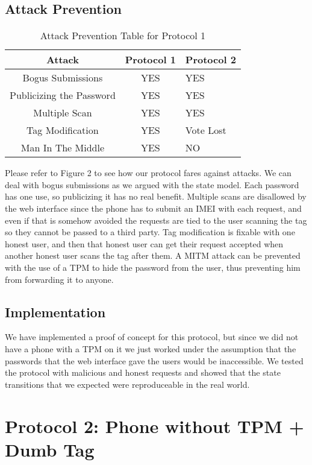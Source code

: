 \documentclass{sig-alternate}
\begin{document}
\subsection{Attack Prevention}
\begin{table}
\centering
\caption{Attack Prevention Table for Protocol 1}
\begin{tabular}{|c|c|l|} \hline
Attack&Protocol 1&Protocol 2\\ \hline
Bogus Submissions & YES & YES\\ \hline
Publicizing the Password& YES & YES\\ \hline
Multiple Scan& YES & YES\\ \hline
Tag Modification& YES & Vote Lost\\ \hline
Man In The Middle& YES & NO\\
\hline\end{tabular}
\end{table}


Please refer to Figure 2 to see how our protocol fares against
attacks. We can deal with bogus submissions as we argued with the
state model. Each password has one use, so publicizing it has no real
benefit. Multiple scans are disallowed by the web interface since the
phone has to submit an IMEI with each request, and even if that is
somehow avoided the requests are tied to the user scanning the tag so
they cannot be passed to a third party. Tag modification is fixable
with one honest user, and then that honest user can get their request
accepted when another honest user scans the tag after them. A MITM
attack can be prevented with the use of a TPM to hide the password
from the user, thus preventing him from forwarding it to anyone.

\subsection{Implementation}
We have implemented a proof of concept for this protocol, but since we
did not have a phone with a TPM on it we just worked under the
assumption that the passwords that the web interface gave the users
would be inaccessible. We tested the protocol with malicious and
honest requests and showed that the state transitions that we expected
were reproduceable in the real world.

\section{Protocol 2: Phone without TPM + Dumb Tag}
\end{document}
